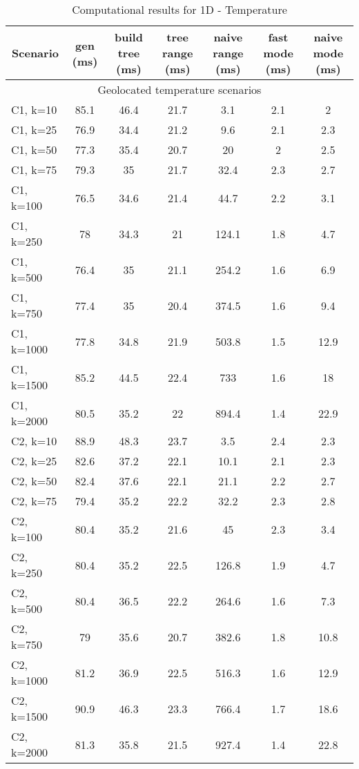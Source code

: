 \documentclass{article}
\begin{document}
\begin{center}
\begin{table}[h]
    \hskip0.8cm
    \begin{tabular}{|l||c|c|c|c|c|c|}
    \hline
    \multicolumn{1}{|c|}{Scenario} & gen (ms) & build tree (ms) & tree range (ms) & naive range (ms) & fast mode (ms) & naive mode (ms) \\
    \hline
    \hline
     \multicolumn{7}{|c|}{Geolocated temperature scenarios} \\
    \hline
    C1, k=10 & 85.1 & 46.4 & 21.7 & 3.1 & 2.1 & 2\\
    C1, k=25 & 76.9 & 34.4 & 21.2 & 9.6 & 2.1 & 2.3\\
    C1, k=50 & 77.3 & 35.4 & 20.7 & 20 & 2 & 2.5\\
    C1, k=75 & 79.3 & 35 & 21.7 & 32.4 & 2.3 & 2.7\\
    C1, k=100 & 76.5 & 34.6 & 21.4 & 44.7 & 2.2 & 3.1\\
    C1, k=250 & 78 & 34.3 & 21 & 124.1 & 1.8 & 4.7\\
    C1, k=500 & 76.4 & 35 & 21.1 & 254.2 & 1.6 & 6.9\\
    C1, k=750 & 77.4 & 35 & 20.4 & 374.5 & 1.6 & 9.4\\
    C1, k=1000 & 77.8 & 34.8 & 21.9 & 503.8 & 1.5 & 12.9\\
    C1, k=1500 & 85.2 & 44.5 & 22.4 & 733 & 1.6 & 18\\
    C1, k=2000 & 80.5 & 35.2 & 22 & 894.4 & 1.4 & 22.9\\
    \hline
    C2, k=10 & 88.9 & 48.3 & 23.7 & 3.5 & 2.4 & 2.3\\
    C2, k=25 & 82.6 & 37.2 & 22.1 & 10.1 & 2.1 & 2.3\\
    C2, k=50 & 82.4 & 37.6 & 22.1 & 21.1 & 2.2 & 2.7\\
    C2, k=75 & 79.4 & 35.2 & 22.2 & 32.2 & 2.3 & 2.8\\
    C2, k=100 & 80.4 & 35.2 & 21.6 & 45 & 2.3 & 3.4\\
    C2, k=250 & 80.4 & 35.2 & 22.5 & 126.8 & 1.9 & 4.7\\
    C2, k=500 & 80.4 & 36.5 & 22.2 & 264.6 & 1.6 & 7.3\\
    C2, k=750 & 79 & 35.6 & 20.7 & 382.6 & 1.8 & 10.8\\
    C2, k=1000 & 81.2 & 36.9 & 22.5 & 516.3 & 1.6 & 12.9\\
    C2, k=1500 & 90.9 & 46.3 & 23.3 & 766.4 & 1.7 & 18.6\\
    C2, k=2000 & 81.3 & 35.8 & 21.5 & 927.4 & 1.4 & 22.8\\
    \hline
    \end{tabular}
    \caption{Computational results for 1D - Temperature}
    \label{tab:1d_real_life}
\end{table}
\end{center}
\restoregeometry
\end{document}
